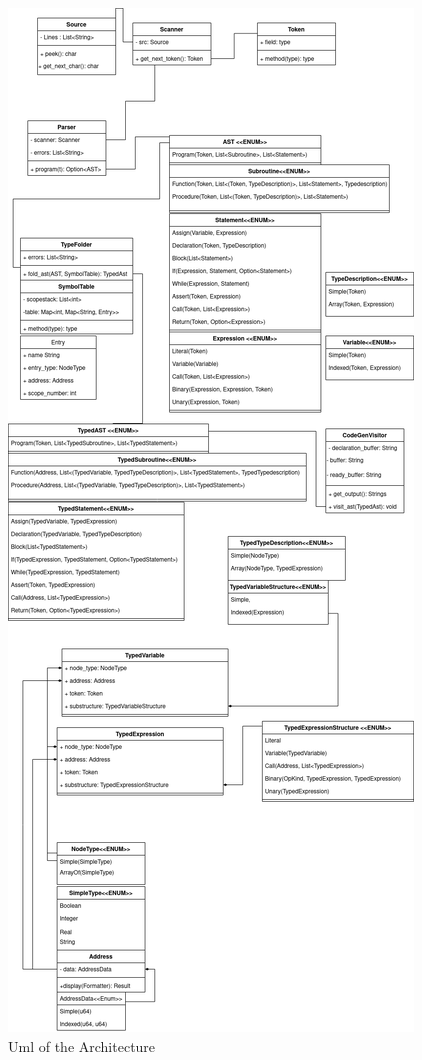 \documentclass[12pt,a4paper]{article}
\begin{document}
\begin{figure}
  \caption{Uml of the Architecture}
  \includegraphics[scale=0.3]{ast}
\end{figure}
\end{document}
